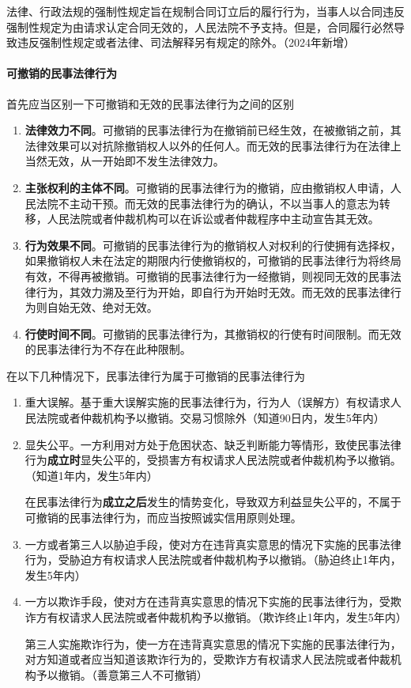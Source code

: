 \documentclass[UTF8,12pt]{ctexart}
\numberwithin{equation}{section} %
\numberwithin{figure}{section}
\numberwithin{table}{section}
\begin{document}
	法律、行政法规的强制性规定旨在规制合同订立后的履行行为，当事人以合同违反强制性规定为由请求认定合同无效的，人民法院不予支持。但是，合同履行必然导致违反强制性规定或者法律、司法解释另有规定的除外。（2024年新增）
	
	\paragraph{可撤销的民事法律行为}
	首先应当区别一下可撤销和无效的民事法律行为之间的区别
	\begin{enumerate}
		\item \textbf{法律效力不同}。可撤销的民事法律行为在撤销前已经生效，在被撤销之前，其法律效果可以对抗除撤销权人以外的任何人。而无效的民事法律行为在法律上当然无效，从一开始即不发生法律效力。
		
		\item \textbf{主张权利的主体不同}。可撤销的民事法律行为的撤销，应由撤销权人申请，人民法院不主动干预。而无效的民事法律行为的确认，不以当事人的意志为转移，人民法院或者仲裁机构可以在诉讼或者仲裁程序中主动宣告其无效。
		
		\item \textbf{行为效果不同}。可撤销的民事法律行为的撤销权人对权利的行使拥有选择权，如果撤销权人未在法定的期限内行使撤销权的，可撤销的民事法律行为将终局有效，不得再被撤销。可撤销的民事法律行为一经撤销，则视同无效的民事法律行为，其效力溯及至行为开始，即自行为开始时无效。而无效的民事法律行为则自始无效、绝对无效。
		
		\item \textbf{行使时间不同}。可撤销的民事法律行为，其撤销权的行使有时间限制。而无效的民事法律行为不存在此种限制。
	\end{enumerate}
	
	在以下几种情况下，民事法律行为属于可撤销的民事法律行为
	\begin{enumerate}
		\item 重大误解。基于重大误解实施的民事法律行为，行为人（误解方）有权请求人民法院或者仲裁机构予以撤销。交易习惯除外（知道90日内，发生5年内）
		
		\item 显失公平。一方利用对方处于危困状态、缺乏判断能力等情形，致使民事法律行为\textbf{成立时}显失公平的，受损害方有权请求人民法院或者仲裁机构予以撤销。（知道1年内，发生5年内）
		
		在民事法律行为\textbf{成立之后}发生的情势变化，导致双方利益显失公平的，不属于可撤销的民事法律行为，而应当按照诚实信用原则处理。
		
		\item 一方或者第三人以胁迫手段，使对方在违背真实意思的情况下实施的民事法律行为，受胁迫方有权请求人民法院或者仲裁机构予以撤销。（胁迫终止1年内，发生5年内）
		
		\item 一方以欺诈手段，使对方在违背真实意思的情况下实施的民事法律行为，受欺诈方有权请求人民法院或者仲裁机构予以撤销。（欺诈终止1年内，发生5年内）
		
		第三人实施欺诈行为，使一方在违背真实意思的情况下实施的民事法律行为，对方知道或者应当知道该欺诈行为的，受欺诈方有权请求人民法院或者仲裁机构予以撤销。（善意第三人不可撤销）
	\end{enumerate}
	
\end{document}
